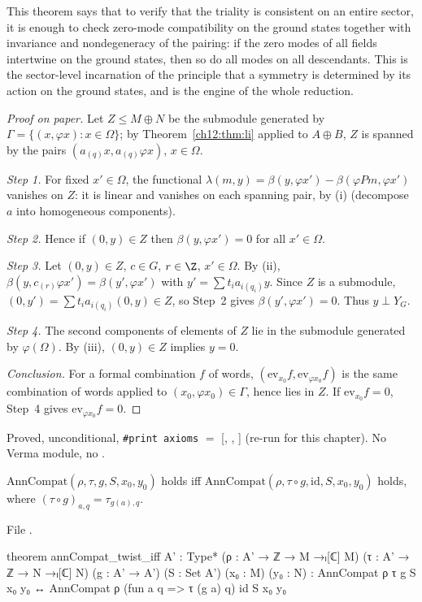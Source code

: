 \begin{physics}
This theorem says that to verify that the triality is consistent on an entire sector, it is enough to check zero-mode compatibility on the ground states together with invariance and nondegeneracy of the pairing: if the zero modes of all fields intertwine on the ground states, then so do all modes on all descendants. This is the sector-level incarnation of the principle that a symmetry is determined by its action on the ground states, and is the engine of the whole reduction.
\end{physics}
\begin{proof}[Proof on paper]
Let $Z\le M\oplus N$ be the submodule generated by $\Gamma=\{(x,\varphi x):x\in\Omega\}$; by
Theorem~\ref{ch12:thm:li} applied to $A\oplus B$, $Z$ is spanned by the pairs
$(a_{(q)}x,a_{(q)}\varphi x)$, $x\in\Omega$.

\emph{Step 1.}  For fixed $x'\in\Omega$, the functional $\lambda(m,y)=\beta(y,\varphi x')-\beta(\varphi
Pm,\varphi x')$ vanishes on $Z$: it is linear and vanishes on each spanning pair, by (i) (decompose
$a$ into homogeneous components).

\emph{Step 2.}  Hence if $(0,y)\in Z$ then $\beta(y,\varphi x')=0$ for all $x'\in\Omega$.

\emph{Step 3.}  Let $(0,y)\in Z$, $c\in G$, $r\in\Z$, $x'\in\Omega$.  By (ii),
$\beta(y,c_{(r)}\varphi x')=\beta(y',\varphi x')$ with $y'=\sum t_ia_{i(q_i)}y$.  Since $Z$ is a
submodule, $(0,y')=\sum t_i a_{i(q_i)}(0,y)\in Z$, so Step~2 gives $\beta(y',\varphi x')=0$.  Thus
$y\perp Y_G$.

\emph{Step 4.}  The second components of elements of $Z$ lie in the submodule generated by
$\varphi(\Omega)$.  By (iii), $(0,y)\in Z$ implies $y=0$.

\emph{Conclusion.}  For a formal combination $f$ of words, $(\mathrm{ev}_{x_0}f,\mathrm{ev}_{\varphi
x_0}f)$ is the same combination of words applied to $(x_0,\varphi x_0)\in\Gamma$, hence lies in $Z$.
If $\mathrm{ev}_{x_0}f=0$, Step~4 gives $\mathrm{ev}_{\varphi x_0}f=0$.
\end{proof}
\begin{status}
Proved, unconditional, \texttt{\#print axioms} $=$ [, ,
] (re-run for this chapter).  No Verma module, no .
\end{status}

\begin{lemma}\label{ch12:lem:twistiff}
$\mathrm{AnnCompat}(\rho,\tau,g,S,x_0,y_0)$ holds iff
$\mathrm{AnnCompat}(\rho,\tau\circ g,\mathrm{id},S,x_0,y_0)$ holds, where $(\tau\circ g)_{a,q}=\tau_{g(a),q}$.
\end{lemma}
File .
\begin{leancode}
theorem annCompat_twist_iff {A' : Type*} (ρ : A' → ℤ → M →ₗ[ℂ] M) (τ : A' → ℤ → N →ₗ[ℂ] N)
    (g : A' → A') (S : Set A') (x₀ : M) (y₀ : N) :
    AnnCompat ρ τ g S x₀ y₀ ↔ AnnCompat ρ (fun a q => τ (g a) q) id S x₀ y₀
\end{leancode}

